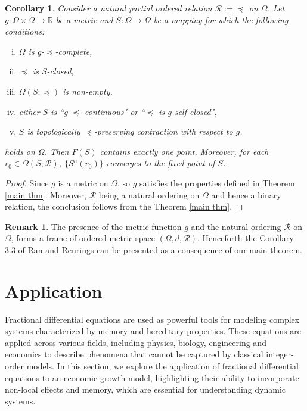 \documentclass[10pt, reqno]{amsart}
\newtheorem{corollary}[theorem]{Corollary}
\theoremstyle{definition}
\newtheorem{remark}[theorem]{Remark}
\theoremstyle{remark}
\numberwithin{equation}{section}
\begin{document}
\begin{corollary}
  Consider a  natural partial ordered relation $\mathcal{R}:=\preceq$ on   $ \Omega $.  Let $ g : \Omega \times \Omega \to \mathbb{R} $  be a    metric    and $ S : \Omega \to \Omega $ be a mapping for which the following conditions:
	\begin{enumerate}[(i)]
		\item $ \Omega $ is $g$-$\preceq$-complete,
		\item $\preceq$ is $ S $-closed,
		\item $ \Omega ( S; \preceq)$ is non-empty,
		\item either $S $ is ``$g$-$\preceq$-continuous" or ``$\preceq$ is $g$-self-closed",
		\item $ S $ is topologically $\preceq$-preserving contraction with respect to $g$. 
	\end{enumerate} 
    
	holds on $ \Omega$. Then $ F ( S ) $ contains exactly one point.  Moreover, for each $r_0\in \Omega ( S; \mathcal{R})$,   $ \{ S^n(r_0) \} $ converges to the fixed point of $S $.  
\end{corollary}
\begin{proof}
    Since $ g $ is a   metric   on $ \Omega $, so $g $ satisfies the properties defined in Theorem \ref{main thm}. Moreover,    $\mathcal{R}$  being a  natural ordering on $ \Omega $ and hence a binary relation, the conclusion      follows from the  Theorem \ref{main thm}.
\end{proof}


\begin{remark}
    The presence of the metric function $g$ and the natural ordering $ \mathcal{R}$ on $ \Omega $, forms a frame of ordered metric space $ ( \Omega, d, \mathcal{R} ) $. Henceforth   the Corollary  3.3 of Ran and Reurings \cite{ran2004fixed}   can be  presented as a consequence   of our main theorem.   
\end{remark}





\section{Application}
Fractional differential equations   are used as    powerful tools for modeling complex systems characterized by memory and hereditary properties. These equations are  applied across various fields, including physics, biology, engineering and economics to describe phenomena that cannot be captured by classical integer-order models. In this section, we explore the application of fractional differential equations to an economic growth model, highlighting their ability to incorporate non-local effects and memory, which are essential for understanding dynamic systems.
  
\end{document}
